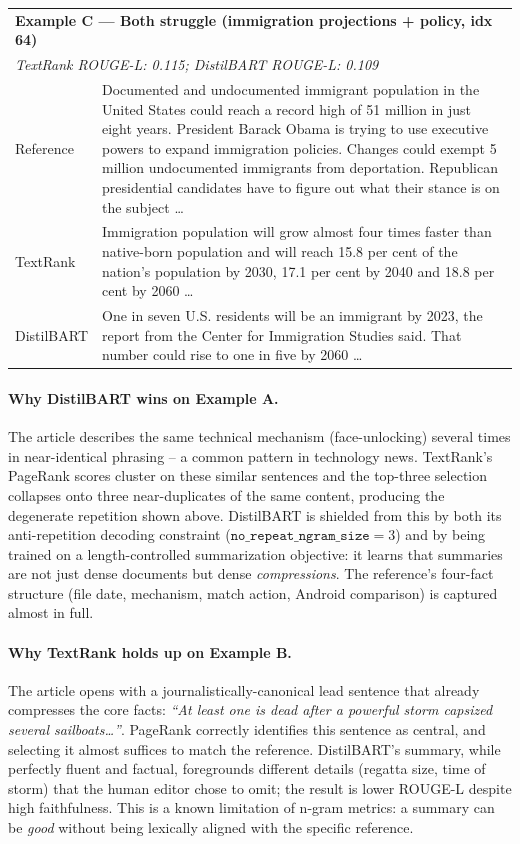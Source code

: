 \documentclass[11pt,a4paper]{article}
\begin{document}
\begin{table}[H]
\begin{tabular}{p{} p{}}
\midrule
\multicolumn{2}{l}{\textbf{Example C — Both struggle (immigration projections + policy, idx 64)}} \\
\multicolumn{2}{l}{\textit{TextRank ROUGE-L: 0.115; DistilBART ROUGE-L: 0.109}} \\
\midrule
Reference & Documented and undocumented immigrant population in the United States could reach a record high of 51 million in just eight years. President Barack Obama is trying to use executive powers to expand immigration policies. Changes could exempt 5 million undocumented immigrants from deportation. Republican presidential candidates have to figure out what their stance is on the subject \ldots \\
TextRank  & Immigration population will grow almost four times faster than native-born population and will reach 15.8 per cent of the nation's population by 2030, 17.1 per cent by 2040 and 18.8 per cent by 2060 \ldots \\
DistilBART & One in seven U.S. residents will be an immigrant by 2023, the report from the Center for Immigration Studies said. That number could rise to one in five by 2060 \ldots \\
\bottomrule
\end{tabular}
\end{table}

\paragraph{Why DistilBART wins on Example A.} The article describes
the same technical mechanism (face-unlocking) several times in
near-identical phrasing -- a common pattern in technology news.
TextRank's PageRank scores cluster on these similar sentences and the
top-three selection collapses onto three near-duplicates of the same
content, producing the degenerate repetition shown above. DistilBART
is shielded from this by both its anti-repetition decoding constraint
($\texttt{no\_repeat\_ngram\_size}{=}3$) and by being trained on a
length-controlled summarization objective: it learns that summaries
are not just dense documents but dense \emph{compressions}. The
reference's four-fact structure (file date, mechanism, match action,
Android comparison) is captured almost in full.

\paragraph{Why TextRank holds up on Example B.} The article opens with
a journalistically-canonical lead sentence that already compresses the
core facts: \emph{``At least one is dead after a powerful storm
capsized several sailboats\ldots''}. PageRank correctly identifies
this sentence as central, and selecting it almost suffices to match
the reference. DistilBART's summary, while perfectly fluent and
factual, foregrounds different details (regatta size, time of storm)
that the human editor chose to omit; the result is lower ROUGE-L
despite high faithfulness. This is a known limitation of n-gram
metrics: a summary can be \emph{good} without being lexically aligned
with the specific reference.
\end{document}
